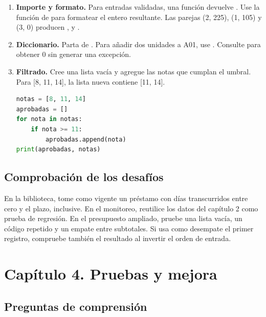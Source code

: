 \begin{enumerate}
\item \textbf{Importe y formato.} Para entradas validadas, una función devuelve . Use la función  de  para formatear el entero resultante. Las parejas (2, 225), (1, 105) y (3, 0) producen ,  y .
\item \textbf{Diccionario.} Parta de . Para añadir dos unidades a A01, use . Consulte  para obtener 0 sin generar una excepción.
\item \textbf{Filtrado.} Cree una lista vacía y agregue las notas que cumplan el umbral. Para [8, 11, 14], la lista nueva contiene [11, 14].
\begin{lstlisting}[style=libro,language=Python]
notas = [8, 11, 14]
aprobadas = []
for nota in notas:
    if nota >= 11:
        aprobadas.append(nota)
print(aprobadas, notas)
\end{lstlisting}
\end{enumerate}

\subsection{Comprobación de los desafíos}

En la biblioteca, tome como vigente un préstamo con días transcurridos entre cero y el plazo, inclusive. En el monitoreo, reutilice los datos del capítulo 2 como prueba de regresión. En el presupuesto ampliado, pruebe una lista vacía, un código repetido y un empate entre subtotales. Si usa como desempate el primer registro, compruebe también el resultado al invertir el orden de entrada.

\section{Capítulo 4. Pruebas y mejora}

\subsection{Preguntas de comprensión}

